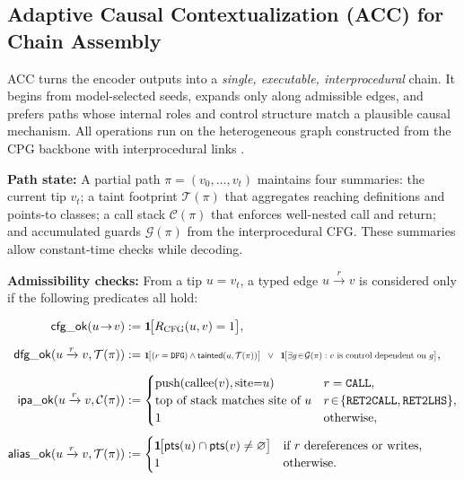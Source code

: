 \documentclass{buthesis}
\begin{document}
\subsection{Adaptive Causal Contextualization (ACC) for Chain Assembly}
\label{sec:model-arch-acc}

ACC turns the encoder outputs into a \emph{single, executable, interprocedural} chain. It begins from model-selected seeds, expands only along admissible edges, and prefers paths whose internal roles and control structure match a plausible causal mechanism. All operations run on the heterogeneous graph constructed from the CPG backbone with interprocedural links \cite{yamaguchi2014cpg}.

\textbf{Path state:}
A partial path $\pi=(v_0,\ldots,v_t)$ maintains four summaries: the current tip $v_t$; a taint footprint $\mathcal{T}(\pi)$ that aggregates reaching definitions and points-to classes; a call stack $\mathcal{C}(\pi)$ that enforces well-nested call and return; and accumulated guards $\mathcal{G}(\pi)$ from the interprocedural CFG. These summaries allow constant-time checks while decoding.

\textbf{Admissibility checks:}
From a tip $u=v_t$, a typed edge $u\xrightarrow{r}v$ is considered only if the following predicates all hold:

\begin{align}
\label{eq:acc-cfg-simple}
\mathsf{cfg\_ok}(u\!\to\!v) &:= \mathbf{1}\!\big[R_{\mathrm{CFG}}(u,v)=1\big],\\[6pt]
\label{eq:acc-dfg-simple}
\mathsf{dfg\_ok}(u\xrightarrow{r}v,\mathcal{T}(\pi)) &:=
\resizebox{0.70\linewidth}{!}{$
\mathbf{1}\!\big[(r=\texttt{DFG}) \wedge \mathsf{tainted}(u,\mathcal{T}(\pi))\big]
\;\;\lor\;\;
\mathbf{1}\!\big[\exists g\!\in\!\mathcal{G}(\pi): v \text{ is control dependent on } g\big]
$},\\[6pt]
\label{eq:acc-ipa-simple}
\mathsf{ipa\_ok}(u\xrightarrow{r}v,\mathcal{C}(\pi)) &:=
\begin{cases}
\text{push}(\mathrm{callee}(v),\mathrm{site}{=}u) & r=\texttt{CALL},\\
\text{top of stack matches site of }u & r\!\in\!\{\texttt{RET2CALL},\texttt{RET2LHS}\},\\
1 & \text{otherwise},
\end{cases}\\[4pt]
\label{eq:acc-alias-simple}
\mathsf{alias\_ok}(u\xrightarrow{r}v,\mathcal{T}(\pi)) &:= 
\begin{cases}
\mathbf{1}\!\big[\mathsf{pts}(u)\cap \mathsf{pts}(v)\neq\varnothing\big] & \text{if } r \text{ dereferences or writes},\\
1 & \text{otherwise}.
\end{cases}
\end{align}
\end{document}
